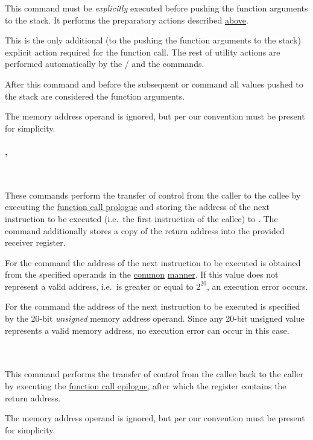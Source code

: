 This command must be \textit{explicitly} executed before pushing the function
arguments to the stack.
It performs the preparatory actions described \hyperlink{functions:prep}{above}.

This is the only additional (to the pushing the function arguments to the stack)
explicit action required for the function call.
The rest of utility actions are performed automatically by
the / and the  commands.

After this command and before the subsequent  or  command
all values pushed to the stack are considered the function arguments.

The memory address operand is ignored, but per our convention must be present
for simplicity.

\vspace{-0.3cm}
\paragraph{, }\

These commands perform the transfer of control from the caller to the callee
by executing the \hyperlink{functions:prologue}{function call prologue}
and storing the address of the next instruction to be executed
(i.e.\ the first instruction of the callee) to .
The  command additionally stores a copy of the return address
into the provided receiver register.

For the  command the address of the next instruction to be executed
is obtained from the specified operands in the
\hyperlink{types:twos_complement}{common}
\hyperlink{types:twos_complement}{manner}.
If this value does not represent a valid address,
i.e.\ is greater or equal to $2^{20}$, an execution error occurs.

For the  command the address of the next instruction to be executed
is specified by the 20-bit \textit{unsigned} memory address operand.
Since any 20-bit unsigned value represents a valid memory address, no execution
error can occur in this case.


\vspace{-0.35cm}
\paragraph{}\

This command performs the transfer of control from the callee back to the caller
by executing the \hyperlink{functions:return}{function call epilogue},
after which the  register contains the return address.

The memory address operand is ignored, but per our convention must be present
for simplicity.

